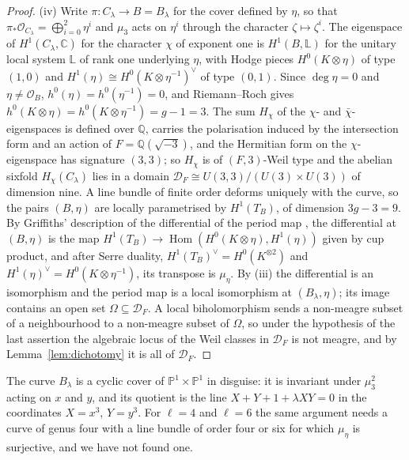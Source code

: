 \documentclass[11pt,reqno]{amsart}
\numberwithin{equation}{section}
\theoremstyle{plain}
\theoremstyle{definition}
\newcommand{\QQ}{\mathbb{Q}}
\newcommand{\CC}{\mathbb{C}}
\newcommand{\PP}{\mathbb{P}}
\newcommand{\cD}{\mathcal{D}}
\begin{document}
\begin{proof}
(iv) Write $\pi\colon C_{\lambda}\to B=B_{\lambda}$ for the cover defined by $\eta$, so that $\pi_{*}\mathcal{O}_{C_{\lambda}}=\bigoplus_{i=0}^{2}\eta^{i}$ and $\mu_{3}$ acts on $\eta^{i}$ through the character $\zeta\mapsto\zeta^{i}$. The eigenspace of $H^{1}(C_{\lambda},\CC)$ for the character $\chi$ of exponent one is $H^{1}(B,\mathbb{L})$ for the unitary local system $\mathbb{L}$ of rank one underlying $\eta$, with Hodge pieces $H^{0}(K\otimes\eta)$ of type $(1,0)$ and $H^{1}(\eta)\cong H^{0}(K\otimes\eta^{-1})^{\vee}$ of type $(0,1)$. Since $\deg\eta=0$ and $\eta\ne\mathcal{O}_{B}$, $h^{0}(\eta)=h^{0}(\eta^{-1})=0$, and Riemann--Roch gives $h^{0}(K\otimes\eta)=h^{0}(K\otimes\eta^{-1})=g-1=3$. The sum $H_{\chi}$ of the $\chi$- and $\bar\chi$-eigenspaces is defined over $\QQ$, carries the polarisation induced by the intersection form and an action of $F=\QQ(\sqrt{-3})$, and the Hermitian form on the $\chi$-eigenspace has signature $(3,3)$; so $H_{\chi}$ is of $(F,3)$-Weil type and the abelian sixfold $H_{\chi}(C_{\lambda})$ lies in a domain $\cD_{F}\cong U(3,3)/(U(3)\times U(3))$ of dimension nine. A line bundle of finite order deforms uniquely with the curve, so the pairs $(B,\eta)$ are locally parametrised by $H^{1}(T_{B})$, of dimension $3g-3=9$. By Griffiths' description of the differential of the period map \cite[Ch.~10]{Voi02}, the differential at $(B,\eta)$ is the map $H^{1}(T_{B})\to\operatorname{Hom}(H^{0}(K\otimes\eta),H^{1}(\eta))$ given by cup product, and after Serre duality, $H^{1}(T_{B})^{\vee}=H^{0}(K^{\otimes2})$ and $H^{1}(\eta)^{\vee}=H^{0}(K\otimes\eta^{-1})$, its transpose is $\mu_{\eta}$. By (iii) the differential is an isomorphism and the period map is a local isomorphism at $(B_{\lambda},\eta)$; its image contains an open set $\Omega\subseteq\cD_{F}$. A local biholomorphism sends a non-meagre subset of a neighbourhood to a non-meagre subset of $\Omega$, so under the hypothesis of the last assertion the algebraic locus of the Weil classes in $\cD_{F}$ is not meagre, and by Lemma~\ref{lem:dichotomy} it is all of $\cD_{F}$.
\end{proof}

The curve $B_{\lambda}$ is a cyclic cover of $\PP^{1}\times\PP^{1}$ in disguise: it is invariant under $\mu_{3}^{2}$ acting on $x$ and $y$, and its quotient is the line $X+Y+1+\lambda XY=0$ in the coordinates $X=x^{3}$, $Y=y^{3}$. For $\ell=4$ and $\ell=6$ the same argument needs a curve of genus four with a line bundle of order four or six for which $\mu_{\eta}$ is surjective, and we have not found one.
\end{document}
